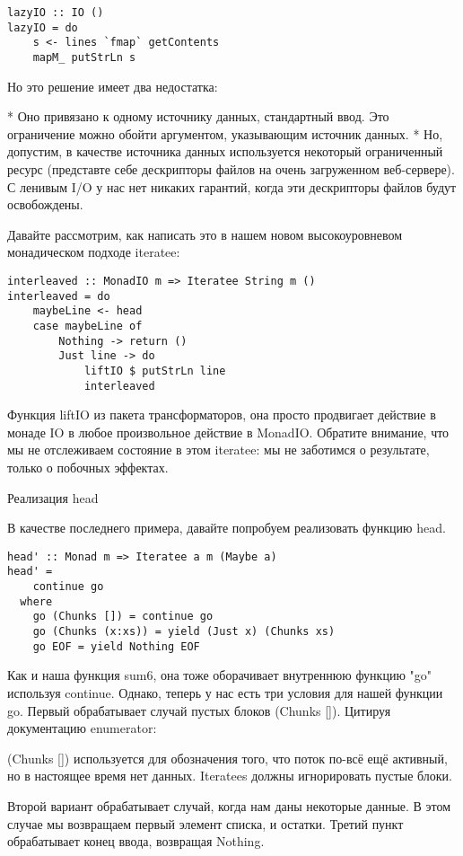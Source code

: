 \begin{lstlisting}
lazyIO :: IO ()
lazyIO = do
    s <- lines `fmap` getContents
    mapM_ putStrLn s
\end{lstlisting}

Но это решение имеет два недостатка:

* Оно привязано к одному источнику данных, стандартный ввод. Это ограничение можно обойти аргументом, указывающим источник данных.
* Но, допустим, в качестве источника данных используется некоторый ограниченный ресурс (представте себе дескрипторы файлов на очень загруженном веб-сервере). С ленивым I/O у нас нет никаких гарантий, когда эти дескрипторы файлов будут освобождены.

Давайте рассмотрим, как написать это в нашем новом высокоуровневом монадическом подходе iteratee:

\begin{lstlisting}
interleaved :: MonadIO m => Iteratee String m ()
interleaved = do
    maybeLine <- head
    case maybeLine of
        Nothing -> return ()
        Just line -> do
            liftIO $ putStrLn line
            interleaved
\end{lstlisting}

Функция liftIO из пакета трансформаторов, она просто продвигает действие в монаде IO в любое произвольное действие в MonadIO. Обратите внимание, что мы не отслеживаем состояние в этом iteratee: мы не заботимся о результате, только о побочных эффектах.

Реализация head

В качестве последнего примера, давайте попробуем реализовать функцию head.

\begin{lstlisting}
head' :: Monad m => Iteratee a m (Maybe a)
head' =
    continue go
  where
    go (Chunks []) = continue go
    go (Chunks (x:xs)) = yield (Just x) (Chunks xs)
    go EOF = yield Nothing EOF
\end{lstlisting}

Как и наша функция sum6, она тоже оборачивает внутреннюю функцию "go" используя continue. Однако, теперь у нас есть три условия для нашей функции go. Первый обрабатывает случай пустых блоков (Chunks []). Цитируя документацию enumerator:

(Chunks []) используется для обозначения того, что поток по-всё ещё активный, но в настоящее время нет данных. Iteratees должны игнорировать пустые блоки.

Второй вариант обрабатывает случай, когда нам даны некоторые данные. В этом случае мы возвращаем первый элемент списка, и остатки. Третий пункт обрабатывает конец ввода, возвращая Nothing.

